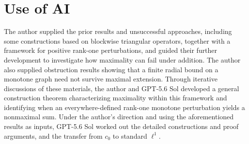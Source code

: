 \documentclass[11pt]{article}
\theoremstyle{definition}
\theoremstyle{remark}
\begin{document}
\section*{Use of AI}
The author supplied the prior results and unsuccessful approaches, including some constructions based on blockwise triangular operators, together with a framework for positive rank-one perturbations, and guided their further development to investigate how maximality can fail under addition. The author also supplied obstruction results showing that a finite radial bound on a monotone graph need not survive maximal extension. Through iterative discussions of these materials, the author and GPT-5.6 Sol developed a general construction theorem characterizing maximality within this framework and identifying when an everywhere-defined rank-one monotone perturbation yields a nonmaximal sum.  Under the author's direction and using the aforementioned results as inputs, GPT-5.6 Sol worked out the detailed constructions and proof arguments, and the transfer from $c_0$ to standard $\ell^1$. 





\begingroup
\raggedright 

\endgroup
\end{document}
